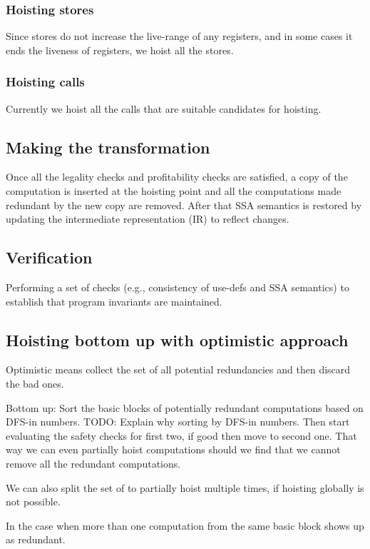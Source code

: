 \documentclass{sig-alternate}
\begin{document}
\subsubsection{Hoisting stores}
Since stores do not increase the live-range of any registers, and in some cases
it ends the liveness of registers, we hoist all the stores.

\subsubsection{Hoisting calls}
Currently we hoist all the calls that are suitable candidates for hoisting.

\subsection{Making the transformation}
Once all the legality checks and profitability checks are satisfied, a copy of
the computation is inserted at the hoisting point and all the computations made
redundant by the new copy are removed. After that SSA semantics is restored by
updating the intermediate representation (IR) to reflect changes.

\subsection{Verification}
Performing a set of checks (e.g., consistency of use-defs and SSA semantics) to
establish that program invariants are maintained.

\subsection{Hoisting bottom up with optimistic approach}
\label{subsec:optimistic}
Optimistic means collect the set of all potential redundancies and
then discard the bad ones.

Bottom up: Sort the basic blocks of potentially redundant computations
based on DFS-in numbers.  TODO: Explain why sorting by DFS-in numbers.
Then start evaluating the safety checks for first two, if good then
move to second one. That way we can even partially hoist computations
should we find that we cannot remove all the redundant computations.

We can also split the set of to partially hoist multiple times, if
hoisting globally is not possible.

In the case when more than one computation from the same basic block
shows up as redundant.
\end{document}
